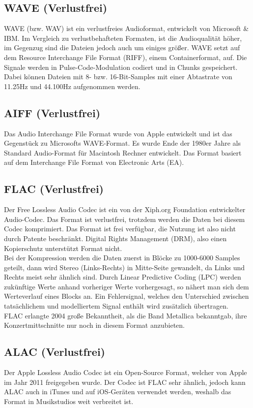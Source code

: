\documentclass{article}
\begin{document}
	\subsection*{WAVE (Verlustfrei)}
	WAVE (bzw. WAV) ist ein verlustfreies Audioformat, entwickelt von Microsoft \& IBM. Im Vergleich zu verlustbehafteten Formaten, ist die Audioqualität höher, im Gegenzug sind die Dateien jedoch auch um einiges größer. WAVE setzt auf dem Resource Interchange File Format (RIFF), einem Containerformat, auf. Die Signale werden in Pulse-Code-Modulation codiert und in Chunks gespeichert. Dabei können Dateien mit 8- bzw. 16-Bit-Samples mit einer Abtastrate von 11.25Hz und 44.100Hz aufgenommen werden. \cite{WAVE}
	
	\subsection*{AIFF (Verlustfrei)}
	Das Audio Interchange File Format wurde von Apple entwickelt und ist das Gegenstück zu Microsofts WAVE-Format. Es wurde Ende der 1980er Jahre als Standard Audio-Format für Macintosh Rechner entwickelt. Das Format basiert auf dem Interchange File Format von Electronic Arts (EA). \cite{AIFF1} \cite{AIFF2}
	
	\subsection*{FLAC (Verlustfrei)}
	Der Free Lossless Audio Codec ist ein von der Xiph.org Foundation entwickelter Audio-Codec. Das Format ist verlustfrei, trotzdem werden die Daten bei diesem Codec komprimiert. Das Format ist frei verfügbar, die Nutzung ist also nicht durch Patente beschränkt. Digital Rights Management (DRM), also einen Kopierschutz unterstützt Format nicht. \cite{FLAC} \\
	Bei der Kompression werden die Daten zuerst in Blöcke zu 1000-6000 Samples geteilt, dann wird Stereo (Links-Rechts) in Mitte-Seite gewandelt, da Links und Rechts meist sehr ähnlich sind. Durch Linear Predictive Coding (LPC) werden zukünftige Werte anhand vorheriger Werte vorhergesagt, so nähert man sich dem Werteverlauf eines Blocks an. Ein Fehlersignal, welches den Unterschied zwischen tatsächlichem und modelliertem Signal enthält wird zusätzlich übertragen. \\
	FLAC erlangte 2004 große Bekanntheit, als die Band Metallica bekanntgab, ihre Konzertmittschnitte nur noch in diesem Format anzubieten. \cite{FLACWiki}
	
	\subsection*{ALAC (Verlustfrei)}
	Der Apple Lossless Audio Codec ist ein Open-Source Format, welcher von Apple im Jahr 2011 freigegeben wurde. Der Codec ist FLAC sehr ähnlich, jedoch kann ALAC auch in iTunes und auf iOS-Geräten verwendet werden, weshalb das Format in Musikstudios weit verbreitet ist. \cite{ALAC}
	
\end{document}
